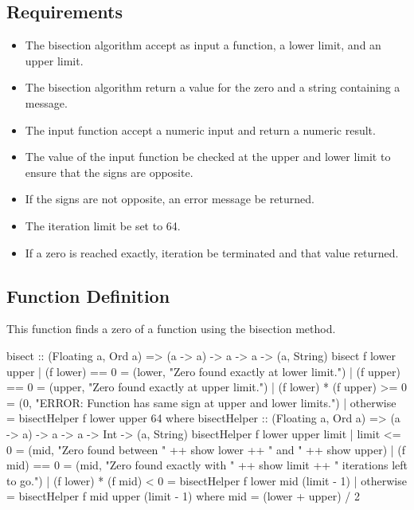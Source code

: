 \subsection{Requirements}
\begin{itemize}
\item The bisection algorithm  accept as input a function, a lower limit, and an upper limit.
\item The bisection algorithm  return a value for the zero and a string containing a message.
\item The input function  accept a numeric input and return a numeric result.
\item The value of the input function  be checked at the upper and lower limit to ensure that the signs are opposite.
\item If the signs are not opposite, an error message  be returned.
\item The iteration limit  be set to 64.
\item If a zero is reached exactly, iteration  be terminated and that value returned.
\end{itemize}

\subsection{Function Definition}
This function finds a zero of a function using the bisection method.
\begin{code}
bisect :: (Floating a, Ord a) => (a -> a) -> a -> a -> (a, String)
bisect f lower upper
  | (f lower) == 0             = (lower, "Zero found exactly at lower limit.")
  | (f upper) == 0             = (upper, "Zero found exactly at upper limit.")
  | (f lower) * (f upper) >= 0 = (0, "ERROR: Function has same sign at upper and lower limits.")
  | otherwise                  = bisectHelper f lower upper 64
  where
    bisectHelper :: (Floating a, Ord a) => (a -> a) -> a -> a -> Int -> (a, String)
    bisectHelper f lower upper limit
      | limit <= 0              = (mid, "Zero found between " ++ show lower ++ " and " ++ show upper)
      | (f mid) == 0            = (mid, "Zero found exactly with " ++ show limit ++ " iterations left to go.")
      | (f lower) * (f mid) < 0 = bisectHelper f lower mid (limit - 1)
      | otherwise               = bisectHelper f mid upper (limit - 1)
      where
        mid = (lower + upper) / 2
\end{code}

